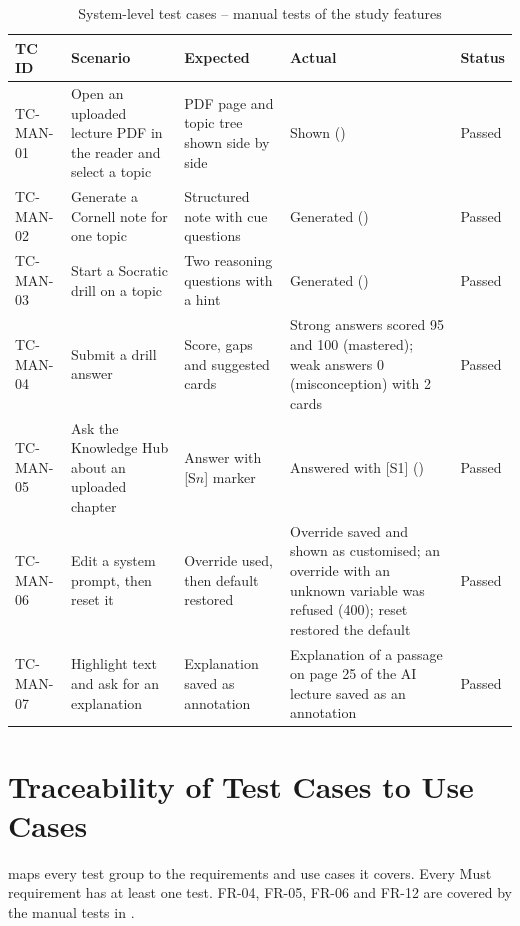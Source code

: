 \begin{table}[!htbp]
\centering
\caption{System-level test cases -- manual tests of the study features}\label{tab:tc_manual}
\tcbody
\begin{tabularx}{\textwidth}{@{}l Y Y Y l@{}}
\toprule
\textbf{TC ID} & \textbf{Scenario} & \textbf{Expected} & \textbf{Actual} & \textbf{Status}\\
\midrule
TC-MAN-01 & Open an uploaded lecture PDF in the reader and select a topic & PDF page and topic tree shown side by side & Shown () & Passed\\
TC-MAN-02 & Generate a Cornell note for one topic & Structured note with cue questions & Generated () & Passed\\
TC-MAN-03 & Start a Socratic drill on a topic & Two reasoning questions with a hint & Generated () & Passed\\
TC-MAN-04 & Submit a drill answer & Score, gaps and suggested cards & Strong answers scored 95 and 100 (mastered); weak answers 0 (misconception) with 2 cards & Passed\\
TC-MAN-05 & Ask the Knowledge Hub about an uploaded chapter & Answer with [S$n$] marker & Answered with [S1] () & Passed\\
TC-MAN-06 & Edit a system prompt, then reset it & Override used, then default restored & Override saved and shown as customised; an override with an unknown variable was refused (400); reset restored the default & Passed\\
TC-MAN-07 & Highlight text and ask for an explanation & Explanation saved as annotation & Explanation of a passage on page 25 of the AI lecture saved as an annotation & Passed\\
\bottomrule
\end{tabularx}
\end{table}

\section{Traceability of Test Cases to Use Cases}

 maps every test group to the requirements and use cases it covers. Every Must requirement
has at least one test. FR-04, FR-05, FR-06 and FR-12 are covered by the manual tests in .

